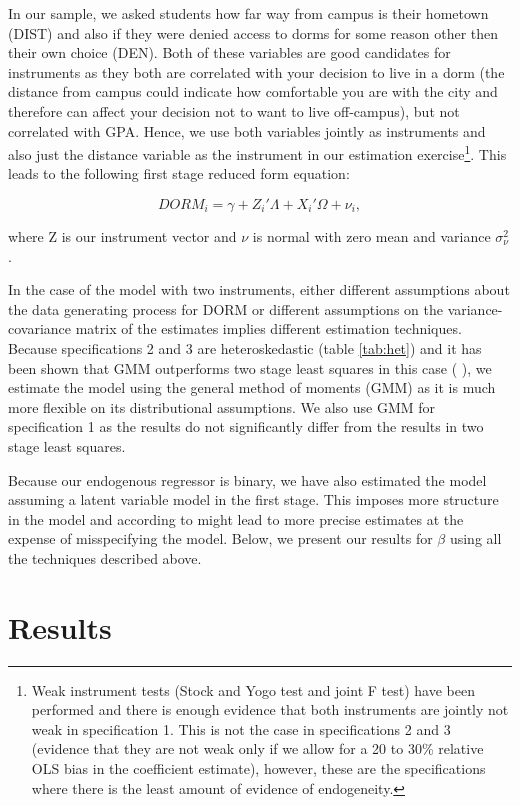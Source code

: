 \documentclass[12pt]{article}
\newcommand{\beq}{\begin{equation}}
\newcommand{\eeq}{\end{equation}}
\newcommand{\citee}[1]{\citename{#1} \citeyear{#1}}
\begin{document}
In our sample, we asked students how far way from campus is their hometown (DIST) and also if they were denied access to dorms for some reason other then their own choice (DEN). Both of these variables are good candidates for instruments as they both are correlated with your decision to live in a dorm (the distance from campus could indicate how comfortable you are with the city and therefore can affect your decision not to want to live off-campus), but not correlated with GPA. Hence, we use both variables jointly as instruments and also just the distance variable as the instrument in our estimation exercise\footnote{Weak instrument tests (Stock and Yogo test and joint F test) have been performed and there is enough evidence that both instruments are jointly not weak in specification 1. This is not the case in specifications 2 and 3 (evidence that they are not weak only if we allow for a 20 to 30\% relative OLS bias in the coefficient estimate), however, these are the specifications where there is the least amount of evidence of endogeneity.}. This leads to the following first stage reduced form equation:

\beq DORM_i  = \gamma + Z_i'\Lambda + X_i'\Omega + \nu_i \label{eq:fsr} ,\eeq

\noindent where Z is our instrument vector and $\nu$ is normal with zero mean and variance $\sigma_{\nu}^2$.

In the case of the model with two instruments, either different assumptions about the data generating process for DORM or different assumptions on the variance-covariance matrix of the estimates implies different estimation techniques. Because specifications 2 and 3 are heteroskedastic (table \ref{tab:het}) and it has been shown that GMM outperforms two stage least squares in this case (\citee{trivedi}), we estimate the model using the general method of moments (GMM) as it is much more flexible on its distributional assumptions. We also use GMM for specification 1 as the results do not significantly differ from the results in two stage least squares.

Because our endogenous regressor is binary, we have also estimated the model assuming a latent variable model in the first stage. This imposes more structure in the model and according to \citee{trivedi} might lead to more precise estimates at the expense of misspecifying the model. Below, we present our results for $\beta$ using all the techniques described above.

\section{Results}
\end{document}
